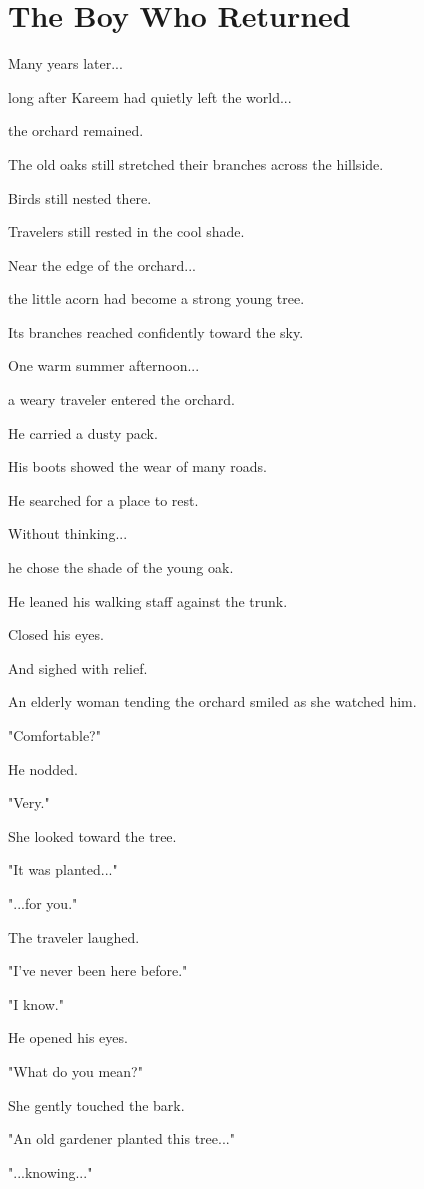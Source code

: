 \documentclass[12pt,openany]{book}
\begin{document}
\section*{The Boy Who Returned}

Many years later...

long after Kareem had quietly left the world...

the orchard remained.

The old oaks still stretched their branches across the hillside.

Birds still nested there.

Travelers still rested in the cool shade.

Near the edge of the orchard...

the little acorn had become a strong young tree.

Its branches reached confidently toward the sky.

One warm summer afternoon...

a weary traveler entered the orchard.

He carried a dusty pack.

His boots showed the wear of many roads.

He searched for a place to rest.

Without thinking...

he chose the shade of the young oak.

He leaned his walking staff against the trunk.

Closed his eyes.

And sighed with relief.

An elderly woman tending the orchard smiled as she watched him.

"Comfortable?"

He nodded.

"Very."

She looked toward the tree.

"It was planted..."

"...for you."

The traveler laughed.

"I've never been here before."

"I know."

He opened his eyes.

"What do you mean?"

She gently touched the bark.

"An old gardener planted this tree..."

"...knowing..."
\end{document}

